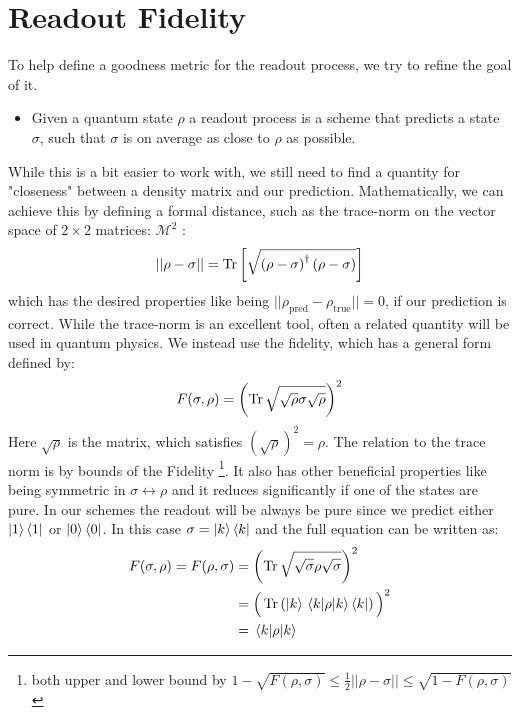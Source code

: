 \section{Readout Fidelity}
To help define a goodness metric for the readout process, we try to refine the goal of it.
\begin{itemize}
    \item Given a quantum state $\rho$ a readout process is a scheme that predicts a state $\sigma$, such that $\sigma$ is on average as close to $\rho$ as possible.
\end{itemize}
While this is a bit easier to work with, we still need to find a quantity for "closeness" between a density matrix and our prediction. Mathematically, we can achieve this by defining a formal distance, such as the trace-norm on the vector space of $2\times2$ matrices: $\mathcal{M}^2$ \cite{wilde_classical_2016}:
\begin{equation}
    ||\rho - \sigma|| = \Tr \left[\sqrt{\left(\rho - \sigma \right)^\dagger \left(\rho - \sigma \right)} \right]
\end{equation}
which has the desired properties like being $||\rho_{\text{pred}} - \rho_{\text{true}}|| = 0$, if our prediction is correct. While the trace-norm is an excellent tool, often a related quantity will be used in quantum physics.  We instead use the fidelity, which has a general form defined by:
\begin{equation}
    F(\sigma, \rho) = \left(\Tr\sqrt{\sqrt{\rho} \sigma \sqrt{\rho}}\right)^2
\end{equation}
Here $\sqrt{\rho}$ is the matrix, which satisfies $(\sqrt{\rho})^2 = \rho$. The relation to the trace norm is by bounds of the Fidelity \footnote{both upper and lower bound by $1 - \sqrt{F(\rho, \sigma)} \leq \frac{1}{2} ||\rho - \sigma|| \leq \sqrt{1 - F(\rho, \sigma)}$ \cite{wilde_classical_2016}}.  It also has other beneficial properties like being  symmetric in $\sigma \leftrightarrow \rho$ and it reduces significantly if one of the states are pure. In our schemes the readout will be always be pure since we predict either $\ket{1}\bra{1}$ or $\ket{0}\bra{0}$. In this case $\sigma = \ket{k}\bra{k}$ and the full equation can be written as:
\begin{align*}
    F(\sigma, \rho) = F(\rho, \sigma) &= \left(\Tr\sqrt{\sqrt{\sigma} \rho \sqrt{\sigma}}\right)^2 \\
    &= \Big(\Tr \left(\ket{k}\mel{k}{\rho}{k}\bra{k}\right)\Big)^2\\
    &= \mel{k}{\rho}{k}
\end{align*}
